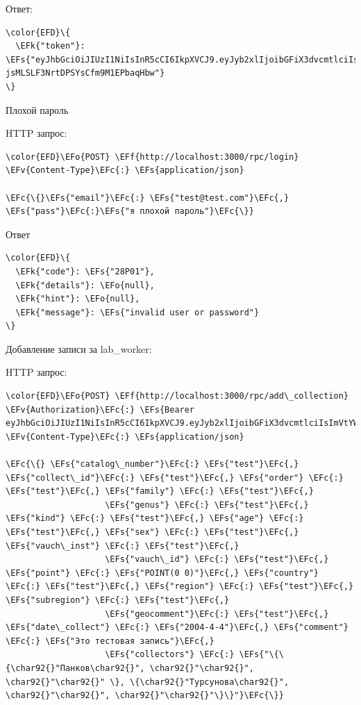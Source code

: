 \documentclass[14pt]{extarticle}
\newcommand{\EFc}[1]{\textcolor{EFc}{#1}} %
\newcommand{\EFs}[1]{\textcolor{EFs}{#1}} %
\newcommand{\EFk}[1]{\textcolor{EFk}{#1}} %
\newcommand{\EFf}[1]{\textcolor{EFf}{#1}} %
\newcommand{\EFv}[1]{\textcolor{EFv}{#1}} %
\newcommand{\EFo}[1]{\textcolor{EFo}{#1}} %
\begin{document}
Ответ:
\begin{Code}
\begin{Verbatim}
\color{EFD}\{
  \EFk{"token"}: \EFs{"eyJhbGciOiJIUzI1NiIsInR5cCI6IkpXVCJ9.eyJyb2xlIjoibGFiX3dvcmtlciIsImVtYWlsIjoidGVzdEB0ZXN0LmNvbSIsImV4cCI6MTY4Mjc3MjEyN30.cI4CN4iIeOPw-jsMLSLF3NrtDPSYsCfm9M1EPbaqHbw"}
\}
\end{Verbatim}
\end{Code}

Плохой пароль


HTTP запрос:
\begin{Code}
\begin{Verbatim}
\color{EFD}\EFo{POST} \EFf{http://localhost:3000/rpc/login}
\EFv{Content-Type}\EFc{:} \EFs{application/json}

\EFc{\{}\EFs{"email"}\EFc{:} \EFs{"test@test.com"}\EFc{,} \EFs{"pass"}\EFc{:}\EFs{"я плохой пароль"}\EFc{\}}
\end{Verbatim}
\end{Code}

Ответ
\begin{Code}
\begin{Verbatim}
\color{EFD}\{
  \EFk{"code"}: \EFs{"28P01"},
  \EFk{"details"}: \EFo{null},
  \EFk{"hint"}: \EFo{null},
  \EFk{"message"}: \EFs{"invalid user or password"}
\}
\end{Verbatim}
\end{Code}


Добавление записи за lab\_​worker:

HTTP запрос:
\begin{Code}
\begin{Verbatim}
\color{EFD}\EFo{POST} \EFf{http://localhost:3000/rpc/add\_collection}
\EFv{Authorization}\EFc{:} \EFs{Bearer eyJhbGciOiJIUzI1NiIsInR5cCI6IkpXVCJ9.eyJyb2xlIjoibGFiX3dvcmtlciIsImVtYWlsIjoidGVzdEB0ZXN0LmNvbSIsImV4cCI6MTY4Mjk1MzU3MX0.IKV4EPcylqRBEoumGboCXfegJJ9bMHsyXngEy1I84I4}
\EFv{Content-Type}\EFc{:} \EFs{application/json}

\EFc{\{} \EFs{"catalog\_number"}\EFc{:} \EFs{"test"}\EFc{,} \EFs{"collect\_id"}\EFc{:} \EFs{"test"}\EFc{,} \EFs{"order"} \EFc{:} \EFs{"test"}\EFc{,} \EFs{"family"} \EFc{:} \EFs{"test"}\EFc{,}
                    \EFs{"genus"} \EFc{:} \EFs{"test"}\EFc{,} \EFs{"kind"} \EFc{:} \EFs{"test"}\EFc{,} \EFs{"age"} \EFc{:} \EFs{"test"}\EFc{,} \EFs{"sex"} \EFc{:} \EFs{"test"}\EFc{,} \EFs{"vauch\_inst"} \EFc{:} \EFs{"test"}\EFc{,}
                    \EFs{"vauch\_id"} \EFc{:} \EFs{"test"}\EFc{,} \EFs{"point"} \EFc{:} \EFs{"POINT(0 0)"}\EFc{,} \EFs{"country"} \EFc{:} \EFs{"test"}\EFc{,} \EFs{"region"} \EFc{:} \EFs{"test"}\EFc{,} \EFs{"subregion"} \EFc{:} \EFs{"test"}\EFc{,}
                    \EFs{"geocomment"}\EFc{:} \EFs{"test"}\EFc{,} \EFs{"date\_collect"} \EFc{:} \EFs{"2004-4-4"}\EFc{,} \EFs{"comment"} \EFc{:} \EFs{"Это тестовая запись"}\EFc{,}
                    \EFs{"collectors"} \EFc{:} \EFs{"\{\{\char92{}"Панков\char92{}", \char92{}"\char92{}", \char92{}"\char92{}" \}, \{\char92{}"Турсунова\char92{}", \char92{}"\char92{}", \char92{}"\char92{}"\}\}"}\EFc{\}}
\end{Verbatim}
\end{Code}
\end{document}
